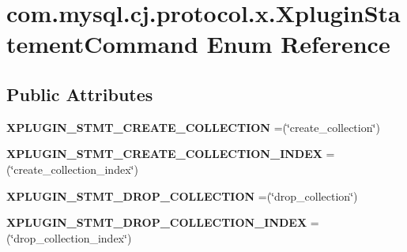\hypertarget{enumcom_1_1mysql_1_1cj_1_1protocol_1_1x_1_1_xplugin_statement_command}{}\section{com.\+mysql.\+cj.\+protocol.\+x.\+Xplugin\+Statement\+Command Enum Reference}
\label{enumcom_1_1mysql_1_1cj_1_1protocol_1_1x_1_1_xplugin_statement_command}
\subsection*{Public Attributes}
\begin{DoxyCompactItemize}
\item 
\mbox{\label{enumcom_1_1mysql_1_1cj_1_1protocol_1_1x_1_1_xplugin_statement_command_a65981b3f328343ade10964ed27ce74c4}} 
{\bfseries X\+P\+L\+U\+G\+I\+N\+\_\+\+S\+T\+M\+T\+\_\+\+C\+R\+E\+A\+T\+E\+\_\+\+C\+O\+L\+L\+E\+C\+T\+I\+ON} =(\char`\"{}create\+\_\+collection\char`\"{})
\item 
\mbox{\label{enumcom_1_1mysql_1_1cj_1_1protocol_1_1x_1_1_xplugin_statement_command_abfc5ac3306dac629ca92693a0426d4de}} 
{\bfseries X\+P\+L\+U\+G\+I\+N\+\_\+\+S\+T\+M\+T\+\_\+\+C\+R\+E\+A\+T\+E\+\_\+\+C\+O\+L\+L\+E\+C\+T\+I\+O\+N\+\_\+\+I\+N\+D\+EX} =(\char`\"{}create\+\_\+collection\+\_\+index\char`\"{})
\item 
\mbox{\label{enumcom_1_1mysql_1_1cj_1_1protocol_1_1x_1_1_xplugin_statement_command_aa4c2e1b6e470e98fa48729bb89bdf0f9}} 
{\bfseries X\+P\+L\+U\+G\+I\+N\+\_\+\+S\+T\+M\+T\+\_\+\+D\+R\+O\+P\+\_\+\+C\+O\+L\+L\+E\+C\+T\+I\+ON} =(\char`\"{}drop\+\_\+collection\char`\"{})
\item 
\mbox{\label{enumcom_1_1mysql_1_1cj_1_1protocol_1_1x_1_1_xplugin_statement_command_a075e70b0148956e8146acd445ffc0626}} 
{\bfseries X\+P\+L\+U\+G\+I\+N\+\_\+\+S\+T\+M\+T\+\_\+\+D\+R\+O\+P\+\_\+\+C\+O\+L\+L\+E\+C\+T\+I\+O\+N\+\_\+\+I\+N\+D\+EX} =(\char`\"{}drop\+\_\+collection\+\_\+index\char`\"{})

\end{DoxyCompactItemize}
